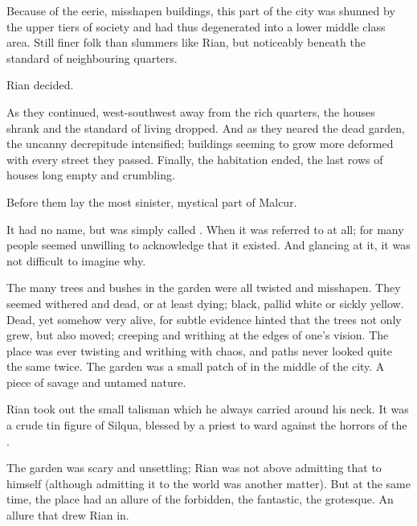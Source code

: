 Because of the eerie, misshapen buildings, this part of the city was shunned by the upper tiers of society and had thus degenerated into a lower middle class area. Still finer folk than slummers like Rian, but noticeably beneath the standard of neighbouring quarters. 

 Rian decided. 

As they continued, west-southwest away from the rich quarters, the houses shrank and the standard of living dropped. And as they neared the dead garden, the uncanny decrepitude intensified; buildings seeming to grow more deformed with every street they passed. Finally, the habitation ended, the last rows of houses long empty and crumbling. 

Before them lay the most sinister, mystical part of Malcur. 

It had no name, but was simply called . 
When it was referred to at all; for many people seemed unwilling to acknowledge that it existed. 
And glancing at it, it was not difficult to imagine why. 

The many trees and bushes in the garden were all twisted and misshapen. They seemed withered and dead, or at least dying; \coloured black, pallid white or sickly yellow. Dead, yet somehow very alive, for subtle evidence hinted that the trees not only grew, but also moved; creeping and writhing at the edges of one's vision. 
The place was ever twisting and writhing with chaos, and paths never looked quite the same twice. 
The garden was a small patch of \wylde in the middle of the city. 
A piece of savage and untamed nature. 

Rian took out the small talisman which he always carried around his neck. 
It was a crude tin figure of Silqua, blessed by a priest to ward against the horrors of the \wylde. 


The garden was scary and unsettling; Rian was not above admitting that to himself (although admitting it to the world was another matter). 
But at the same time, the place had an allure of the forbidden, the fantastic, the grotesque. 
An allure that drew Rian in. 

